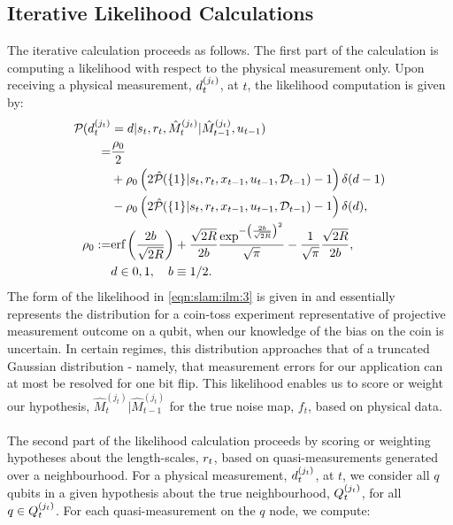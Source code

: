 \subsection{Iterative Likelihood Calculations}
The iterative calculation proceeds as follows. The first part of the calculation is computing a likelihood with respect to the physical measurement only. Upon receiving a physical measurement, $d^{( j_t )}_{t}$, at $t$, the likelihood computation is given by:
\begin{align}
\mathcal{P}_{} ( d^{( j_t )}_{t}&=d | s_{ t}, r_{ t}, \hat{M}_t^{(j_t)}| \hat{M}_{t-1}^{(j_t)}, u_{t-1} ) \nonumber \\
 = & \frac{\rho_0}{2} \nonumber \\
& + \rho_0 \left(  2\hat{\mathcal{P}}_{} (\{1\} | s_{ t}, r_{ t}, x_{t-1}, u_{t-1}, \mathcal{D}_{t-1}) - 1 \right)  \delta(d-1) \nonumber \\
& - \rho_0 \left(  2\hat{\mathcal{P}}_{} (\{1\} | s_{ t}, r_{ t}, x_{t-1}, u_{t-1}, \mathcal{D}_{t-1}) - 1 \right) \delta(d), \label{eqn:slam:ilm:3} \\
\rho_0 :=& \text{erf}\left( \frac{2b}{\sqrt{2R}}\right) + \frac{\sqrt{2R}}{2b}\frac{\exp^{-\left( \frac{2b}{\sqrt{2R}}\right)^2}}{\sqrt{\pi}} - \frac{1}{\sqrt{\pi}} \frac{\sqrt{2R}}{2b}, \label{eqn:slam:ilm:4} \\
&d \in {0,1}, \quad b \equiv 1/2.  \label{eqn:slam:ilm:5}
\end{align} The form of the likelihood  in \cref{eqn:slam:ilm:3} is given in \cite{riddhissensorpaper} and essentially represents the distribution for a coin-toss experiment representative of projective measurement outcome on a qubit, when our knowledge of the bias on the coin is uncertain. In certain regimes, this distribution approaches that of a truncated Gaussian distribution - namely, that measurement errors for our application can at most be resolved for one bit flip. This likelihood enables us to score or weight our hypothesis, $\hat{M}_t^{(j_t)}| \hat{M}_{t-1}^{(j_t)}$ for the true noise map, $f_t$, based on physical data. \\
\\
The second part of the likelihood calculation proceeds by scoring or weighting hypotheses about the length-scales, $r_{ t}$, based on quasi-measurements generated over a neighbourhood. For a physical measurement, $d^{( j_t )}_{t}$, at $t$, we consider all $q$ qubits in a given hypothesis about the true neighbourhood, $Q^{( j_t )}_{t}$, for all $q \in Q^{( j_t )}_{t}$. For each quasi-measurement on the $q$ node, we compute:
